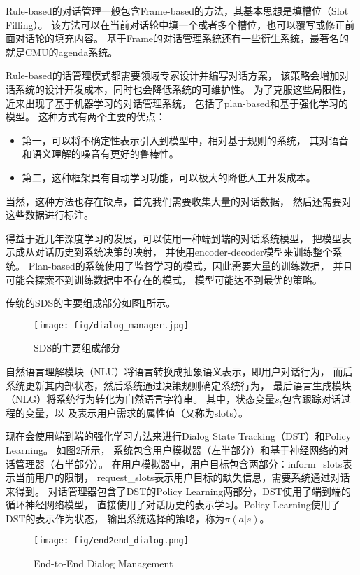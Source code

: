 Rule-based的对话管理一般包含Frame-based的方法，其基本思想是填槽位（Slot Filling）。
该方法可以在当前对话轮中填一个或者多个槽位，也可以覆写或修正前面对话轮的填充内容。
基于Frame的对话管理系统还有一些衍生系统，最著名的就是CMU的agenda系统。

Rule-based的话管理模式都需要领域专家设计并编写对话方案，
该策略会增加对话系统的设计开发成本，同时也会降低系统的可维护性。
为了克服这些局限性，近来出现了基于机器学习的对话管理系统，
包括了plan-based和基于强化学习的模型。
这种方式有两个主要的优点：

\begin{itemize}
	\item 第一，可以将不确定性表示引入到模型中，相对基于规则的系统，
	其对语音和语义理解的噪音有更好的鲁棒性。
	\item 第二，这种框架具有自动学习功能，可以极大的降低人工开发成本。
\end{itemize}
当然，这种方法也存在缺点，首先我们需要收集大量的对话数据，
然后还需要对这些数据进行标注。

得益于近几年深度学习的发展，可以使用一种端到端的对话系统模型，
把模型表示成从对话历史到系统决策的映射，
并使用encoder-decoder模型来训练整个系统。
Plan-based的系统使用了监督学习的模式，因此需要大量的训练数据，
并且可能会探索不到训练数据中不存在的模式，
模型可能达不到最优的策略。

传统的SDS的主要组成部分如图\ref{fig:dialog_manager}所示。
\begin{figure}[h]
	\centering
	\texttt{[image: fig/dialog\_manager.jpg]}
	\caption{SDS的主要组成部分} 
	\label{fig:dialog_manager}
\end{figure}

自然语言理解模块（NLU）将语言转换成抽象语义表示，即用户对话行为，
而后系统更新其内部状态，然后系统通过决策规则确定系统行为，
最后语言生成模块（NLG）将系统行为转化为自然语言字符串。
其中，状态变量$s_t$包含跟踪对话过程的变量，以
及表示用户需求的属性值（又称为slots）。

现在会使用端到端的强化学习方法来进行Dialog State Tracking（DST）和Policy Learning。
如图\ref{fig:end2end_dialog}所示，
系统包含用户模拟器（左半部分）和基于神经网络的对话管理器（右半部分）。
在用户模拟器中，用户目标包含两部分：inform\_slots表示当前用户的限制，
request\_slots表示用户目标的缺失信息，需要系统通过对话来得到。
对话管理器包含了DST的Policy Learning两部分，DST使用了端到端的循环神经网络模型，
直接使用了对话历史的表示学习。Policy Learning使用了DST的表示作为状态，
输出系统选择的策略，称为$\pi(a|s)$。

\begin{figure}[h]
	\centering
	\texttt{[image: fig/end2end\_dialog.png]}
	\caption{End-to-End Dialog Management} \label{fig:end2end_dialog}
\end{figure}

